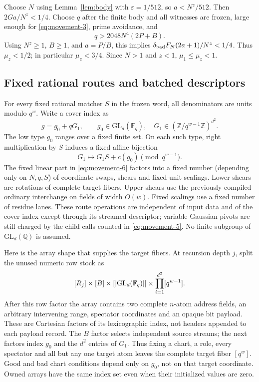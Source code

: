 Choose $N$ using Lemma~\ref{lem:body} with $\varepsilon=1/512$, so
$a<N^z/512$. Then $2Ga/N^z<1/4$. Choose $q$ after the finite body and
all witnesses are frozen, large enough for \eqref{eq:movement-3}, prime avoidance, and
\[
 q>2048N^4(2P+B).
\]
Using $N^z\ge1$, $B\ge1$, and $a=P/B$, this implies
$\delta_{\rm bad}F_N(2a+1)/N^z<1/4$. Thus $\mu_z<1/2$; in particular
$\mu_z<3/4$. Since $N>1$ and $z<1$, $\mu_1\le\mu_z<1$.

\subsection{Fixed rational routes and batched descriptors}

For every fixed rational matcher $S$ in the frozen word, all denominators
are units modulo $q^w$. Write a cover index as
\[
 g=g_0+qG_1,\qquad g_0\in\mathrm{GL}_{d}(\mathbb F_q),
 \quad G_1\in(\mathbb Z/q^{w-1}\mathbb Z)^{d^2}.
\]
The low type $g_0$ ranges over a fixed finite set. On each such type,
right multiplication by $S$ induces a fixed affine bijection
\begin{equation}
 G_1\longmapsto G_1S+c(g_0)\pmod {q^{w-1}}.             \label{eq:movement-6}
\end{equation}
The fixed linear part in \eqref{eq:movement-6} factors into a fixed number (depending
only on $N,q,S$) of coordinate swaps, shears and fixed-unit scalings.
Lower shears are rotations of complete target fibers. Upper shears use
the previously compiled ordinary interchange on fields of width $O(w)$.
Fixed scalings use a fixed number of residue lanes. These route operations
are independent of input data and of the cover index except through its
streamed descriptor; variable Gaussian pivots are still charged by the
child calls counted in \eqref{eq:movement-5}. No finite subgroup of $\mathrm{GL}_d(\mathbb Q)$
is assumed.

Here is the array shape that supplies the target fibers. At recursion
depth $j$, split the unused numeric row stock as
\[
 [R_j]\times[B]\times[|\mathrm{GL}_d(\mathbb F_q)|]
 \times\prod_{i=1}^{d^2}[q^{w-1}].
\]
After this row factor the array contains two complete $n$-atom address
fields, an arbitrary intervening range, spectator coordinates and an
opaque bit payload. These are
Cartesian factors of its lexicographic index, not headers appended to
each payload record. The $B$ factor selects independent source streams;
the next factors index $g_0$ and the $d^2$ entries of $G_1$. Thus fixing
a chart, a role, every spectator and all but any one target atom leaves
the complete target fiber $[q^w]$. Good and bad chart conditions depend
only on $g_0$, not on that target coordinate. Owned arrays have the same
index set even when their initialized values are zero.


